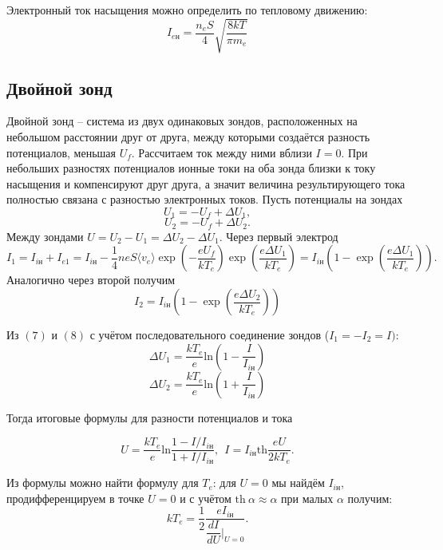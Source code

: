 \documentclass[a4paper,12pt]{article}
\begin{document}
  Электронный ток насыщения можно определить по тепловому движению:
  \[I_{e\text{н}} = \frac{n_eS}{4}\sqrt{\frac{8kT}{\pi m_e}}\]


    \subsection*{Двойной зонд}
  Двойной зонд -- система из двух одинаковых зондов, расположенных на небольшом расстоянии друг от друга, между которыми создаётся разность потенциалов, меньшая $U_f$. Рассчитаем ток между ними вблизи $I=0$. При небольших разностях потенциалов ионные токи на оба зонда близки к току насыщения и компенсируют друг друга, а значит величина результирующего тока полностью связана с разностью электронных токов. Пусть потенциалы на зондах
  $$
  U_1 = -U_f + \Delta U_1,
  $$
  $$
  U_2 = -U_f + \Delta U_2.
  $$
  Между зондами $U = U_2 - U_1 = \Delta U_2 - \Delta U_1$.
  Через первый электрод
  \begin{equation}
    I_1 = I_{i\text{н}} + I_{e1} = I_{i\text{н}} - \dfrac{1}{4}neS\langle v_e\rangle \exp\left(-\dfrac{eU_f}{kT_e}\right)\exp\left(\dfrac{e\Delta U_1}{kT_e}\right)=I_{i\text{н}}\left(1 - \exp\left( \dfrac{e\Delta U_1}{kT_e} \right)\right).
  \end{equation}
  Аналогично через второй получим
  \begin{equation}
    I_2 = I_{i\text{н}}\left(1 - \exp\left( \dfrac{e\Delta U_2}{kT_e} \right)\right)
  \end{equation}
  
  Из $(7)$ и $(8)$ с учётом последовательного соединение зондов ($I_1 = -I_2 = I)$:
  $$
  \Delta U_1= \dfrac{kT_e}{e}\text{ln}\left(1 - \dfrac{I}{I_{i\text{н}}}\right)
  $$
  $$
  \Delta U_2= \dfrac{kT_e}{e}\text{ln}\left(1 + \dfrac{I}{I_{i\text{н}}}\right)
  $$
  
  Тогда итоговые формулы для разности потенциалов и тока
  
  \begin{equation}
    U = \dfrac{kT_e}{e}\text{ln}\dfrac{1 - I/I_{i\text{н}}}{1 + I/I_{i\text{н}}}, \ \
    I = I_{i\text{н}} \text{th}\dfrac{eU}{2kT_e}.
  \end{equation}

  Из формулы можно найти формулу для $T_e$: для $U=0$ мы найдём $I_{i\text{н}}$, продифференцируем в точке $U=0$ и с учётом $\text{th}~\alpha \approx \alpha$ при малых $\alpha$ получим:
  \begin{equation}
    kT_e = \dfrac{1}{2}\dfrac{eI_{i\text{н}}}{\dfrac{dI}{dU}|_{U=0}}.
  \end{equation}
\end{document}
